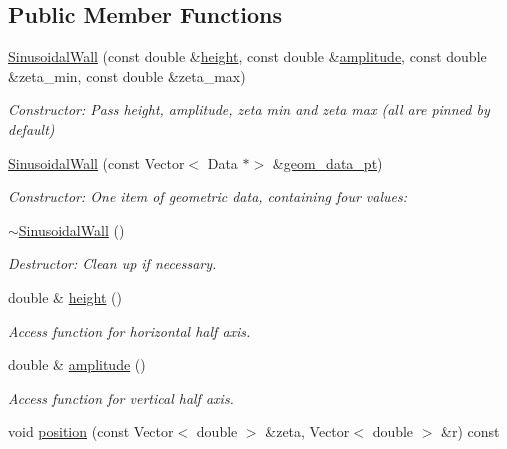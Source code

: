 \subsection*{Public Member Functions}
\begin{DoxyCompactItemize}
\item 
\hyperlink{classSinusoidalWall_a6179a8823d039fc3b090db1cfce30a36}{Sinusoidal\+Wall} (const double \&\hyperlink{classSinusoidalWall_a78861ab97b81bc78e05c3ec260c6479d}{height}, const double \&\hyperlink{classSinusoidalWall_a654a7ccf081040971442d8534f1e6807}{amplitude}, const double \&zeta\+\_\+min, const double \&zeta\+\_\+max)
\begin{DoxyCompactList}\small\item\em Constructor\+: Pass height, amplitude, zeta min and zeta max (all are pinned by default) \end{DoxyCompactList}\item 
\hyperlink{classSinusoidalWall_ac437fb52cca5a1b467f6f87ecc2c75aa}{Sinusoidal\+Wall} (const Vector$<$ Data $\ast$$>$ \&\hyperlink{classSinusoidalWall_ab9dc7c9e02dac3171c378cea6949f544}{geom\+\_\+data\+\_\+pt})
\begin{DoxyCompactList}\small\item\em Constructor\+: One item of geometric data, containing four values\+: \end{DoxyCompactList}\item 
\hyperlink{classSinusoidalWall_a7e5c29a951c707cb87e168ed943a7956}{$\sim$\+Sinusoidal\+Wall} ()
\begin{DoxyCompactList}\small\item\em Destructor\+: Clean up if necessary. \end{DoxyCompactList}\item 
double \& \hyperlink{classSinusoidalWall_a78861ab97b81bc78e05c3ec260c6479d}{height} ()
\begin{DoxyCompactList}\small\item\em Access function for horizontal half axis. \end{DoxyCompactList}\item 
double \& \hyperlink{classSinusoidalWall_a654a7ccf081040971442d8534f1e6807}{amplitude} ()
\begin{DoxyCompactList}\small\item\em Access function for vertical half axis. \end{DoxyCompactList}\item 
void \hyperlink{classSinusoidalWall_a8a1ce17bdb30f20894e1d85668877502}{position} (const Vector$<$ double $>$ \&zeta, Vector$<$ double $>$ \&r) const
$$
\end{DoxyCompactItemize}

